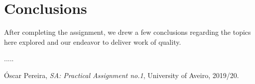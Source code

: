 \documentclass[12pt]{article}
\begin{document}
\newpage
\section{Conclusions} %

After completing the assignment, we drew a few conclusions regarding the topics here explored and our endeavor to deliver work of quality.

.....

\begin{thebibliography}{9} %
  

    Óscar Pereira,
    \textit{SA: Practical Assignment no.1},
    University of Aveiro,
    2019/20.
  

  
\end{thebibliography}

\clearpage
\end{document}
